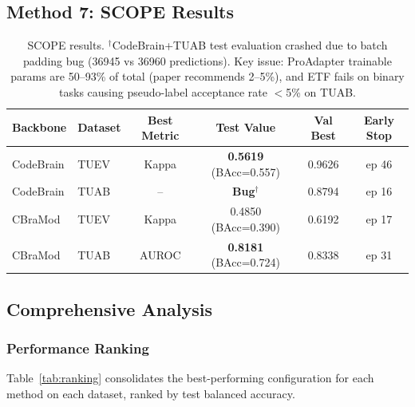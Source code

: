 \documentclass{article}
\begin{document}
\subsection{Method 7: SCOPE Results}

\begin{table}[h]
\centering
\small
\begin{tabular}{@{}llcccc@{}}
\toprule
Backbone & Dataset & Best Metric & Test Value & Val Best & Early Stop \\
\midrule
CodeBrain & TUEV & Kappa & \textbf{0.5619} (BAcc=0.557) & 0.9626 & ep 46 \\
CodeBrain & TUAB & -- & \textbf{Bug}$^\dagger$ & 0.8794 & ep 16 \\
CBraMod & TUEV & Kappa & 0.4850 (BAcc=0.390) & 0.6192 & ep 17 \\
CBraMod & TUAB & AUROC & \textbf{0.8181} (BAcc=0.724) & 0.8338 & ep 31 \\
\bottomrule
\end{tabular}
\caption{SCOPE results. $^\dagger$CodeBrain+TUAB test evaluation crashed due to batch padding bug (36945 vs 36960 predictions). Key issue: ProAdapter trainable params are 50--93\% of total (paper recommends 2--5\%), and ETF fails on binary tasks causing pseudo-label acceptance rate $<$5\% on TUAB.}
\end{table}

\subsection{Comprehensive Analysis}
\label{sec:analysis}

\subsubsection{Performance Ranking}

Table~\ref{tab:ranking} consolidates the best-performing configuration for each method on each dataset, ranked by test balanced accuracy.
\end{document}
